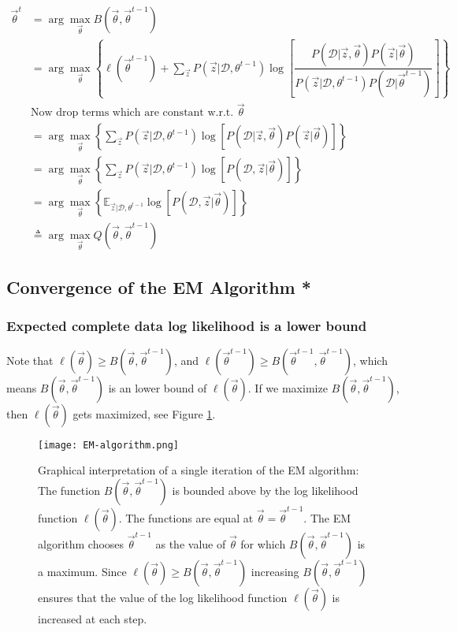 \begin{align}
\vec{\theta}^t &= \arg\max\limits_{\vec{\theta}} B(\vec{\theta},\vec{\theta}^{t-1})  \nonumber \\
                &= \arg\max\limits_{\vec{\theta}}{\left\{ \ell(\vec{\theta}^{t-1})+\sum\limits_{\vec{z}} P(\vec{z}|\mathcal{D},\theta^{t-1})\log\left[\dfrac{P(\mathcal{D}|\vec{z},\vec{\theta})P(\vec{z}|\vec{\theta})}{P(\vec{z}|\mathcal{D},\theta^{t-1})P(\mathcal{D}|\vec{\theta}^{t-1})}\right]\right\}} \nonumber \\
				& \text{Now drop terms which are constant w.r.t. } \vec{\theta} \nonumber \\
				&= \arg\max\limits_{\vec{\theta}}{\left\{\sum\limits_{\vec{z}} P(\vec{z}|\mathcal{D},\theta^{t-1})\log\left[P(\mathcal{D}|\vec{z},\vec{\theta})P(\vec{z}|\vec{\theta})\right]\right\}} \nonumber \\
				&= \arg\max\limits_{\vec{\theta}}{\left\{\sum\limits_{\vec{z}} P(\vec{z}|\mathcal{D},\theta^{t-1})\log\left[P(\mathcal{D},\vec{z}|\vec{\theta})\right]\right\}} \nonumber \\
				&= \arg\max\limits_{\vec{\theta}}{\left\{\mathbb{E}_{\vec{z}|\mathcal{D},\theta^{t-1}}\log\left[P(\mathcal{D},\vec{z}|\vec{\theta})\right]\right\}} \\
				&\triangleq \arg\max\limits_{\vec{\theta}}{Q(\vec{\theta}, \vec{\theta}^{t-1})}
\end{align}


\subsection{Convergence of the EM Algorithm *}

\subsubsection{Expected complete data log likelihood is a lower bound}

Note that $\ell(\vec{\theta}) \geq B(\vec{\theta},\vec{\theta}^{t-1})$, and $\ell(\vec{\theta}^{t-1}) \geq B(\vec{\theta}^{t-1},\vec{\theta}^{t-1})$, which means $B(\vec{\theta},\vec{\theta}^{t-1})$ is an lower bound of $\ell(\vec{\theta})$. If we maximize $B(\vec{\theta},\vec{\theta}^{t-1})$, then $\ell(\vec{\theta})$ gets maximized, see Figure \ref{fig:EM-algorithm}.

\begin{figure}[hbtp]
\centering
    \texttt{[image: EM-algorithm.png]}
\caption{Graphical interpretation of a single iteration of the EM algorithm: The function $B(\vec{\theta},\vec{\theta}^{t-1})$ is bounded above by the log likelihood function $\ell(\vec{\theta})$. The functions are equal at $\vec{\theta} = \vec{\theta}^{t-1}$. The EM algorithm chooses $\vec{\theta}^{t-1}$ as the value of $\vec{\theta}$ for which $B(\vec{\theta},\vec{\theta}^{t-1})$ is a maximum. Since $\ell(\vec{\theta}) \geq B(\vec{\theta},\vec{\theta}^{t-1})$ increasing $B(\vec{\theta},\vec{\theta}^{t-1})$ ensures that the value of the log likelihood function $\ell(\vec{\theta})$ is increased at each step.}
\label{fig:EM-algorithm} 
\end{figure}

